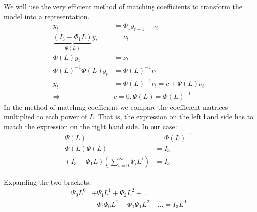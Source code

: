 \begin{enumerate}
          \begin{sol}
              We will use the very efficient method of matching coefficients to transform the \varp[1]{} model into a \vmaq[$\infty$]{} representation.
              \begin{align*}
                  y_t
                   & = \Phi_1 y_{t-1} + \nu_t
                  \\
                  \underbrace{(I_3 - \Phi_1 L)}_{\Phi(L)} y_t
                   & = \nu_t
                  \\
                  \Phi(L) y_t
                   & = \nu_t
                  \\
                  \Phi(L)^{-1} \Phi(L) y_t
                   & = \Phi(L)^{-1} \nu_t
                  \\
                  y_t
                   & = \Phi(L)^{-1} \nu_t
                   = c + \Psi(L) \nu_t
                  \\
                  \Rightarrow
                   & c = 0,
                   \Psi(L) = \Phi(L)^{-1}
              \end{align*}
              In the method of matching coefficient we compare the coefficient matrices multiplied to each power of $L$. That is, the expression on the left hand side has to match the expression on the right hand side. In our case:
              \begin{align*}
                  \Psi(L)
                   & = \Phi(L)^{-1}
                  \\
                  \Phi(L) \Psi(L)
                   & = I_3
                  \\
                  (I_3 - \Phi_1 L) \left(\sum_{i=0}^\infty \Psi_i L^i\right)
                   & = I_3
              \end{align*}

              Expanding the two brackets:
              \begin{align*}
                  \Psi_0 L^0
                   & + \Psi_1 L^1 + \Psi_2 L^2 + \dots
                  \\
                   & - \Phi_1 \Psi_0 L^1 - \Phi_1 \Psi_1 L^2 - \dots = I_3 L^0
              \end{align*}


\end{sol}
\end{enumerate}
